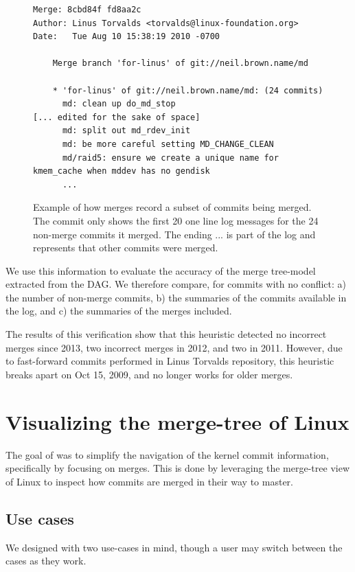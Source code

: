 \documentclass[conference, draftclsnofoot, draft]{IEEEtran}
\begin{document}
\begin{figure}[htbp]
  \centering
{\tiny
\begin{verbatim}
Merge: 8cbd84f fd8aa2c
Author: Linus Torvalds <torvalds@linux-foundation.org>
Date:   Tue Aug 10 15:38:19 2010 -0700

    Merge branch 'for-linus' of git://neil.brown.name/md
    
    * 'for-linus' of git://neil.brown.name/md: (24 commits)
      md: clean up do_md_stop
[... edited for the sake of space]
      md: split out md_rdev_init
      md: be more careful setting MD_CHANGE_CLEAN
      md/raid5: ensure we create a unique name for kmem_cache when mddev has no gendisk
      ...
\end{verbatim}}
  \caption{Example of how merges record a subset of commits being merged. The commit only shows the first 20 one line log messages for the 24 non-merge commits
    it merged. The ending ... is part of the log and represents that other commits were merged.}
  \label{fig:sampleMerge}
\end{figure}

We use this information to evaluate the accuracy of the merge tree-model extracted from the DAG. We therefore compare, for commits with no conflict: a) the number of
non-merge commits, b) the summaries of the commits available in the log, and c) the summaries of the merges included.

The results of this verification show that this heuristic detected no incorrect merges since 2013, two incorrect merges in 2012, and two in 2011. However, due
to fast-forward commits performed in Linus Torvalds repository, this heuristic breaks apart on Oct 15, 2009, and no longer works for older merges. 


\section{Visualizing the merge-tree of Linux}

The goal of \tool was to simplify the  navigation of the kernel commit information, specifically by focusing on merges.
This is done by leveraging the merge-tree view of Linux to inspect how commits are merged in their way to master.

\subsection{Use cases}

We designed \tool with two use-cases in mind, though a user may switch
between the cases as they work.
\end{document}

